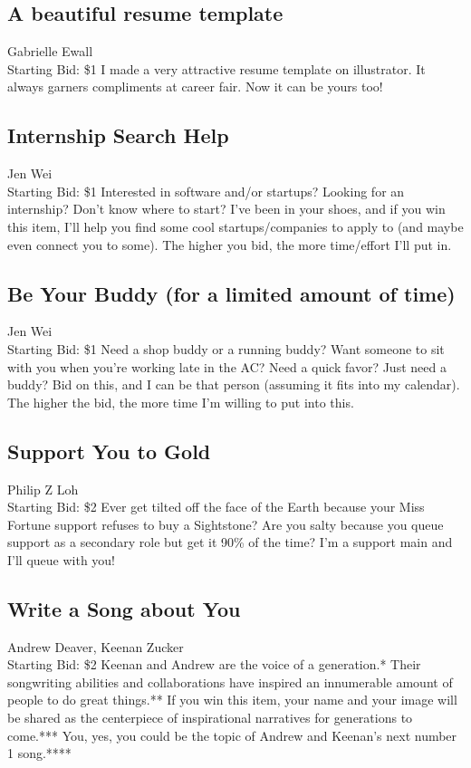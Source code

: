 \documentclass[11pt]{article}
\begin{document}
\subsection{A beautiful resume template }
Gabrielle Ewall
\\
Starting Bid: \$1
\newline
I made a very attractive resume template on illustrator. It always garners compliments at career fair. Now it can be yours too!
\subsection{Internship Search Help}
Jen Wei
\\
Starting Bid: \$1
\newline
Interested in software and/or startups? Looking for an internship? Don't know where to start? I've been in your shoes, and if you win this item, I'll help you find some cool startups/companies to apply to (and maybe even connect you to some). The higher you bid, the more time/effort I'll put in.
\subsection{Be Your Buddy (for a limited amount of time)}
Jen Wei
\\
Starting Bid: \$1
\newline
Need a shop buddy or a running buddy? Want someone to sit with you when you're working late in the AC? Need a quick favor? Just need a buddy? Bid on this, and I can be that person (assuming it fits into my calendar). The higher the bid, the more time I'm willing to put into this.
\subsection{Support You to Gold}
Philip Z Loh
\\
Starting Bid: \$2
\newline
Ever get tilted off the face of the Earth because your Miss Fortune support refuses to buy a Sightstone? Are you salty because you queue support as a secondary role but get it 90\% of the time? I'm a support main and I'll queue with you!
\subsection{Write a Song about You}
Andrew Deaver, Keenan Zucker
\\
Starting Bid: \$2
\newline
Keenan and Andrew are the voice of a generation.* Their songwriting abilities and collaborations have inspired an innumerable amount of people to do great things.** If you win this item, your name and your image will be shared as the centerpiece of inspirational narratives for generations to come.*** You, yes, you could be the topic of Andrew and Keenan's next number 1 song.****
\end{document}

